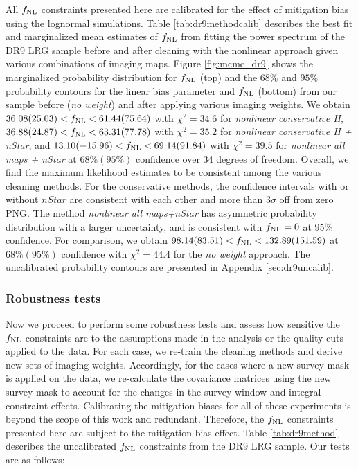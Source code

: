 All $f_{\rm NL}$ constraints presented here are calibrated for the effect of mitigation bias using the lognormal simulations. Table \ref{tab:dr9methodcalib} describes the best fit and marginalized mean estimates of $f_{\rm NL}$ from fitting the power spectrum of the DR9 LRG sample before and after cleaning with the nonlinear approach given various combinations of imaging maps. Figure \ref{fig:mcmc_dr9} shows the marginalized probability distribution for $f_{\rm NL}$ (top) and the $68\%$ and $95\%$ probability contours for the linear bias parameter and $f_{\rm NL}$ (bottom) from our sample before (\textit{no weight}) and after applying various imaging weights. We obtain $36.08 (25.03) < f_{\rm NL} < 61.44(75.64)$ with $\chi^{2}=34.6$ for \textit{nonlinear conservative II}, $36.88(24.87) < f_{\rm NL} < 63.31(77.78)$ with $\chi^{2}=35.2$ for \textit{nonlinear conservative II + nStar}, and $13.10(-15.96) < f_{\rm NL} < 69.14(91.84)$ with $\chi^{2}=39.5$ for \textit{nonlinear all maps + nStar} at $68\% (95\%)$ confidence over 34 degrees of freedom. Overall, we find the maximum likelihood estimates to be consistent among the various cleaning methods. For the conservative methods, the confidence intervals with or without $nStar$ are consistent with each other and more than $3\sigma$ off from zero PNG. The method \textit{nonlinear all maps+nStar} has asymmetric probability distribution with a larger uncertainty, and is consistent with $f_{\rm NL}=0$ at $95\%$ confidence. For comparison, we obtain $98.14(83.51) < f_{\rm NL} < 132.89(151.59)$ at $68\% (95\%)$ confidence with $\chi^{2}=44.4$ for the \textit{no weight} approach. The uncalibrated probability contours are presented in Appendix \ref{sec:dr9uncalib}.


\subsubsection{Robustness tests}
Now we proceed to perform some robustness tests and assess how sensitive the $f_{\rm NL}$ constraints are to the assumptions made in the analysis or the quality cuts applied to the data. For each case, we re-train the cleaning methods and derive new sets of imaging weights. Accordingly, for the cases where a new survey mask is applied on the data, we re-calculate the covariance matrices using the new survey mask to account for the changes in the survey window and integral constraint effects. Calibrating the mitigation biases for all of these experiments is beyond the scope of this work and redundant. Therefore, the $f_{\rm NL}$ constraints presented here are subject to the mitigation bias effect. Table \ref{tab:dr9method} describes the uncalibrated $f_{\rm NL}$ constraints from the DR9 LRG sample. Our tests are as follows:

